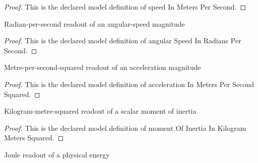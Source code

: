 \begin{proof}
  This is the declared model definition of speed In Meters Per Second.
\end{proof}
\begin{definition}
  \label{def:physics:phyx-mini-0780:phyxminiproblems-problemphyxmini0780-angularspeedinradianspersecond}
  Radian-per-second readout of an angular-speed magnitude
\end{definition}
\begin{proof}
  This is the declared model definition of angular Speed In Radians Per Second.
\end{proof}
\begin{definition}
  \label{def:physics:phyx-mini-0780:phyxminiproblems-problemphyxmini0780-accelerationinmeterspersecondsquared}
  Metre-per-second-squared readout of an acceleration magnitude
\end{definition}
\begin{proof}
  This is the declared model definition of acceleration In Meters Per Second Squared.
\end{proof}
\begin{definition}
  \label{def:physics:phyx-mini-0780:phyxminiproblems-problemphyxmini0780-momentofinertiainkilogrammeterssquared}
  Kilogram-metre-squared readout of a scalar moment of inertia
\end{definition}
\begin{proof}
  This is the declared model definition of moment Of Inertia In Kilogram Meters Squared.
\end{proof}
\begin{definition}
  \label{def:physics:phyx-mini-0780:phyxminiproblems-problemphyxmini0780-energyinjoules}
  Joule readout of a physical energy
\end{definition}

